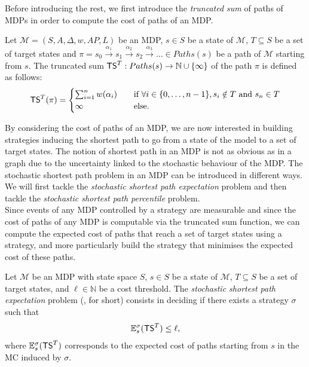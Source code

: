 Before introducing the rest, we first introduce the \textit{truncated sum} of paths of MDPs in order to compute the cost of paths of an MDP.

\begin{definition}
	Let $\mathcal{M} = (S, A, \Delta, w, AP, L)$ be an MDP, $s \in S$ be a state of $\mathcal{M}$, $T \subseteq S$ be a set of target states and
	$\pi = s_0 \xrightarrow{\alpha_1} s_1 \xrightarrow{\alpha_2} s_2 \xrightarrow{\alpha_3} \dots \in Paths(s)$ be a path of
	$\mathcal{M}$ starting from $s$. The truncated sum $\text{\sffamily TS}^T: Paths(s)
	\rightarrow \mathbb{N} \cup \{\infty\}$ of the path $\pi$ is defined as follows:
	\[
		\text{\sffamily TS}^T(\pi) =
		\begin{cases}
			\sum_{i = 1}^{n} w(\alpha_i) & \quad \text{if } \forall i \in \{0, \dots, n - 1\}, s_i \notin T \text{ and } s_n \in T \\
			\infty & \quad \text{else.}
		\end{cases}
	\]

\end{definition}

By considering the cost of paths of an MDP, we are now interested in building
strategies inducing the shortest path to go from a state of the model to a set of target
states. The notion of shortest path in an MDP is not as obvious as in a graph due to the uncertainty linked to the stochastic behaviour of the MDP.
The stochastic shortest path problem in an MDP can be introduced in different
ways. We will first tackle the \textit{stochastic shortest path expectation} problem and
then tackle the \textit{stochastic shortest path percentile} problem. \\

Since events of any MDP controlled by a strategy are measurable and
since the cost of paths of any MDP is computable via the truncated sum function, we can
compute the expected cost of paths that reach a set of target states using a strategy, and more particularly build the strategy that minimises the expected cost of these paths.

\begin{definition}\label{sspe}
Let $\mathcal{M}$ be an MDP with state space $S$, $s \in S$ be a state of $\mathcal{M}$,
$T \subseteq S$ be a set of target states, and $\ell \in \mathbb{N}$ be a cost threshold. The \textit{stochastic shortest path expectation} problem (\SSPE{}, for short)
consists in deciding if there exists a strategy $\sigma$ such that
\[
  \mathbb{E}^\sigma_s(\text{\sffamily TS}^T) \leq \ell,
\]
where $\mathbb{E}_s^\sigma(\text{\sffamily TS}^T)$ corresponds to the expected cost of paths starting from $s$ in the MC induced by $\sigma$.
\end{definition}


